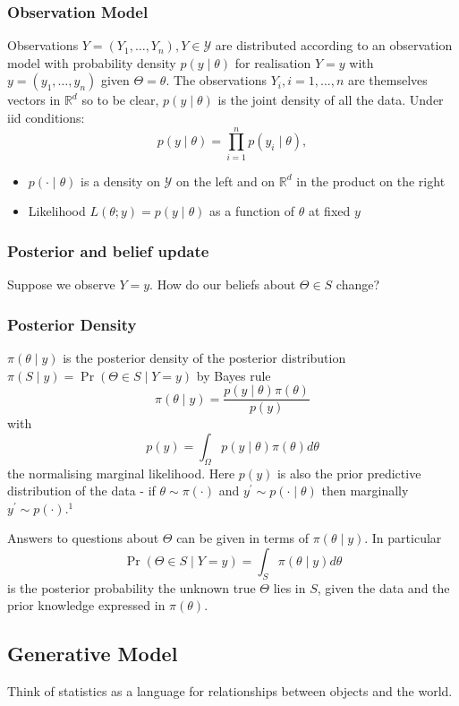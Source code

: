 \documentclass{article}
\begin{document}
\subsubsection{Observation Model}
Observations $Y=\left(Y_1, \ldots, Y_n\right), Y \in \mathcal{Y}$ are distributed according to an observation model with probability density $p(y \mid \theta)$ for realisation $Y=y$ with $y=\left(y_1, \ldots, y_n\right)$ given $\Theta=\theta$. The observations $Y_i, i=1, \ldots, n$ are themselves vectors in $\mathbb{R}^d$ so to be clear, $p(y \mid \theta)$ is the joint density of all the data.
Under iid conditions:
$$
p(y \mid \theta)=\prod_{i=1}^n p\left(y_i \mid \theta\right),
$$
\begin{itemize}
    \item $p(\cdot \mid \theta)$ is a density on $\mathcal{Y}$ on the left and on $\mathbb{R}^d$ in the product on the right
    \item  Likelihood $L(\theta ; y)=p(y \mid \theta)$ as a function of $\theta$ at fixed $y$
\end{itemize}
\subsubsection{Posterior and belief update}
Suppose we observe $Y=y$. How do our beliefs about $\Theta \in S$ change? 
\subsubsection{Posterior Density}
$\pi(\theta \mid y)$ is the posterior density of the posterior distribution $\pi(S \mid y)=\operatorname{Pr}(\Theta \in S \mid Y=y)$  by Bayes rule
$$
\pi(\theta \mid y)=\frac{p(y \mid \theta) \pi(\theta)}{p(y)}
$$
with
$$
p(y)=\int_{\Omega} p(y \mid \theta) \pi(\theta) d \theta
$$
the normalising marginal likelihood. Here $p(y)$ is also the prior predictive distribution of the data - if $\theta \sim \pi(\cdot)$ and $y^{\prime} \sim p(\cdot \mid \theta)$ then marginally $y^{\prime} \sim p(\cdot) .^1$

Answers to questions about $\Theta$ can be given in terms of $\pi(\theta \mid y)$. In particular
$$
\operatorname{Pr}(\Theta \in S \mid Y=y)=\int_S \pi(\theta \mid y) d \theta
$$
is the posterior probability the unknown true $\Theta$ lies in $S$, given the data and the prior knowledge expressed in $\pi(\theta)$.
\subsection{Generative Model}
Think of statistics as a language for relationships between objects and the world.
\end{document}
